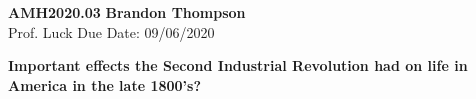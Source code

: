 \noindent
\textbf{AMH2020.03} \hfill \textbf{Brandon Thompson} \\
\normalsize Prof. Luck \hfill Due Date: 09/06/2020 \\

\begin{center}
\textbf{Important effects the Second Industrial Revolution had on life in America in the late 1800's?}
\end{center}
